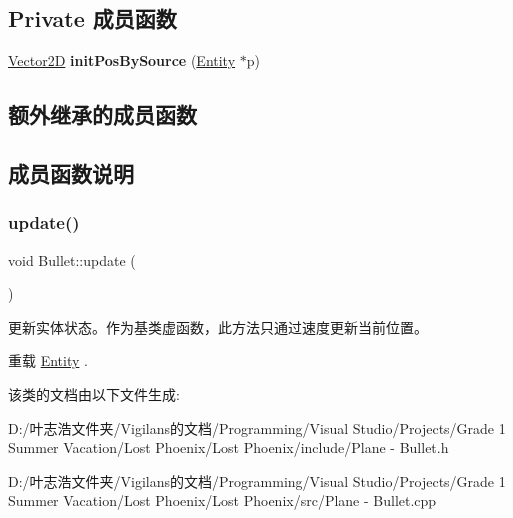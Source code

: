 \subsection*{Private 成员函数}
\begin{DoxyCompactItemize}
\item 
\mbox{\label{class_bullet_ac8350c88346ae354e7144fa20b6cb2a2}} 
\hyperlink{structbasic__vector2_d}{Vector2D} {\bfseries init\+Pos\+By\+Source} (\hyperlink{class_entity}{Entity} $\ast$p)
\end{DoxyCompactItemize}
\subsection*{额外继承的成员函数}


\subsection{成员函数说明}
\mbox{\label{class_bullet_a32f4a0611fe2dd245fee955d14ca1f68}} 
\subsubsection{\texorpdfstring{update()}{update()}}
{\footnotesize\ttfamily void Bullet\+::update (\begin{DoxyParamCaption}{ }\end{DoxyParamCaption})\hspace{0.3cm}{\ttfamily [virtual]}}



更新实体状态。作为基类虚函数，此方法只通过速度更新当前位置。 



重载 \hyperlink{class_entity_a00b6eeaf99b35c8f8b10b5fbfc1baf4f}{Entity} .



该类的文档由以下文件生成\+:\begin{DoxyCompactItemize}
\item 
D\+:/叶志浩文件夹/\+Vigilans的文档/\+Programming/\+Visual Studio/\+Projects/\+Grade 1 Summer Vacation/\+Lost Phoenix/\+Lost Phoenix/include/Plane -\/ Bullet.\+h\item 
D\+:/叶志浩文件夹/\+Vigilans的文档/\+Programming/\+Visual Studio/\+Projects/\+Grade 1 Summer Vacation/\+Lost Phoenix/\+Lost Phoenix/src/Plane -\/ Bullet.\+cpp\end{DoxyCompactItemize}
